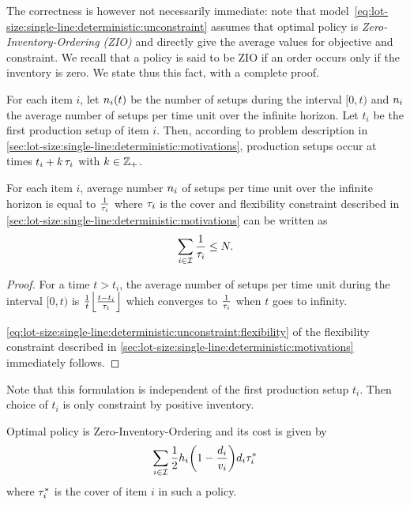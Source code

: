 The correctness is however not necessarily immediate: note that model~\eqref{eq:lot-size:single-line:deterministic:unconstraint} assumes that optimal policy is \emph{Zero-Inventory-Ordering (ZIO)} and directly give the average values for objective and constraint.
We recall that a policy is said to be ZIO if an order occurs only if the inventory is zero.
We state thus this fact, with a complete proof.


For each item $i$, let $\freq_i\bracket{t}$ be the number of setups during the interval $[0,t)$ and $n_i$ the average number of setups per time unit over the infinite horizon.
Let $t_i$ be the first production setup of item $i$.
Then, according to problem description in \cref{sec:lot-size:single-line:deterministic:motivations}, production setups occur at times $t_i+k\,\tau_i$ with $k\in\mathbb{Z}_+$.


\begin{prop}\label{prop:lot-size:single-line:models:average-setup}
For each item $i$, average number $n_i$ of setups per time unit over the infinite horizon is equal to $\frac{1}{\tau_i}$ where $\tau_i$ is the cover and flexibility constraint described in \cref{sec:lot-size:single-line:deterministic:motivations} can be written as
\begin{equation}
  \sum_{i\in\mathcal{I}} \frac{1}{\tau_i} \le N.
\end{equation}
\end{prop}


\begin{proof}
For a time $t>t_i$, the average number of setups per time unit during the interval $[0,t)$ is
$\frac{1}{t}\left\lfloor\frac{t-t_i}{\cover_i}\right\rfloor$
which converges to $\frac{1}{\tau_i}$ when $t$ goes to infinity.

\cref{eq:lot-size:single-line:deterministic:unconstraint:flexibility} of the flexibility constraint described in \cref{sec:lot-size:single-line:deterministic:motivations} immediately follows.
\end{proof}


Note that this formulation is independent of the first production setup $t_i$.
Then choice of $t_i$ is only constraint by positive inventory.


\begin{prop}\label{prop:lot-size:single-line:models:ZIO}
Optimal policy is Zero-Inventory-Ordering and its cost is given by
\begin{equation}
  \sum_{i\in\REF}\frac{1}{2}\holding_i\bracket{1-\frac{\demand_i}{\rate_i}}\demand_i\cover_i^*
\end{equation}
where $\tau_i^*$ is the cover of item $i$ in such a policy.
\end{prop}


